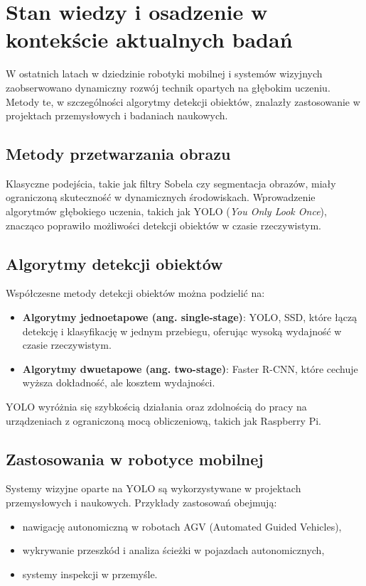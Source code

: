 \documentclass[a4paper,twoside,12pt]{book}
\begin{document}
\newpage

\section{Stan wiedzy i osadzenie w kontekście aktualnych badań}
W ostatnich latach w dziedzinie robotyki mobilnej i systemów wizyjnych zaobserwowano dynamiczny rozwój technik opartych na głębokim uczeniu. Metody te, w szczególności algorytmy detekcji obiektów, znalazły zastosowanie w projektach przemysłowych i badaniach naukowych.

\subsection{Metody przetwarzania obrazu}
Klasyczne podejścia, takie jak filtry Sobela czy segmentacja obrazów, miały ograniczoną skuteczność w dynamicznych środowiskach. Wprowadzenie algorytmów głębokiego uczenia, takich jak YOLO (\textit{You Only Look Once}), znacząco poprawiło możliwości detekcji obiektów w czasie rzeczywistym.

\subsection{Algorytmy detekcji obiektów}
Współczesne metody detekcji obiektów można podzielić na:
\begin{itemize}
    \item \textbf{Algorytmy jednoetapowe (ang. single-stage)}: YOLO, SSD, które łączą detekcję i klasyfikację w jednym przebiegu, oferując wysoką wydajność w czasie rzeczywistym.
    \item \textbf{Algorytmy dwuetapowe (ang. two-stage)}: Faster R-CNN, które cechuje wyższa dokładność, ale kosztem wydajności.
\end{itemize}
YOLO wyróżnia się szybkością działania oraz zdolnością do pracy na urządzeniach z ograniczoną mocą obliczeniową, takich jak Raspberry Pi.

\subsection{Zastosowania w robotyce mobilnej}
Systemy wizyjne oparte na YOLO są wykorzystywane w projektach przemysłowych i naukowych. Przykłady zastosowań obejmują:
\begin{itemize}
    \item nawigację autonomiczną w robotach AGV (Automated Guided Vehicles),
    \item wykrywanie przeszkód i analiza ścieżki w pojazdach autonomicznych,
    \item systemy inspekcji w przemyśle.
\end{itemize}
\end{document}
